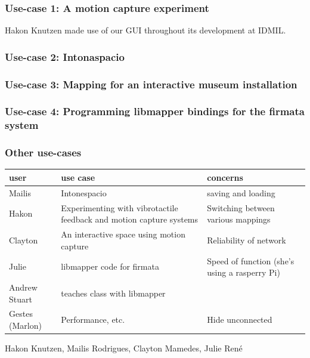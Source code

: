 		\subsubsection{Use-case 1: A motion capture experiment}

Hakon Knutzen made use of our GUI throughout its development at IDMIL. 

		\subsubsection{Use-case 2: Intonaspacio}

		\subsubsection{Use-case 3: Mapping for an interactive museum installation}

		\subsubsection{Use-case 4: Programming libmapper bindings for the firmata system}

		\subsubsection{Other use-cases}

\begin{table}
\begin{center}
\begin{tabular}{l p{5cm} p{5cm}}
	\hline\hline
	user&use case&concerns\\
	\hline
	Mailis&Intonespacio&saving and loading\\
	Hakon&Experimenting with vibrotactile feedback and motion capture systems&Switching between various mappings\\
	Clayton&An interactive space using motion capture&Reliability of network\\
	Julie&libmapper code for firmata&Speed of function (she's using a rasperry Pi)\\
	\hline
	Andrew Stuart&teaches class with libmapper&\\
	Gestes (Marlon)&Performance, etc.&Hide unconnected\\
\end{tabular}
\end{center}	
\end{table}

Hakon Knutzen, Mailis Rodrigues, Clayton Mamedes, Julie Ren\'e

